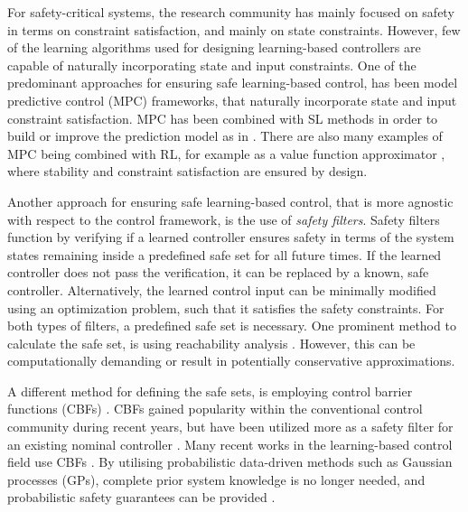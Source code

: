 \documentclass[3p,times,procedia]{elsarticle}
\begin{document}
For safety-critical systems, the research community has mainly focused on safety in terms on constraint satisfaction, and mainly on state constraints. However, few of the learning algorithms used for designing learning-based controllers are capable of naturally incorporating state and input constraints. One of the predominant approaches for ensuring safe learning-based control, has been model predictive control (MPC) frameworks, that naturally incorporate state and input constraint satisfaction. MPC has been combined with SL methods in order to build or improve the prediction model as in \cite{manzano2020robust, Seel2021}. There are also many examples of MPC being combined with RL, for example as a value function approximator \cite{zanon2020safe, gros2019towards}, where stability and constraint satisfaction are ensured by design.


Another approach for ensuring safe learning-based control, that is more agnostic with respect to the control framework, is the use of \textit{safety filters}. Safety filters function by verifying if a learned controller ensures safety in terms of the system states remaining inside a predefined safe set for all future times. If the learned controller does not pass the verification, it can be replaced by a known, safe controller. Alternatively, the learned control input can be minimally modified using an optimization problem, such that it satisfies the safety constraints. For both types of filters, a predefined safe set is necessary. One prominent method to calculate the safe set, is using reachability analysis \cite{Gillula2012}. However, this can be computationally demanding or result in potentially conservative approximations. 



A different method for defining the safe sets, is employing control barrier functions (CBFs) \cite{Wieland2007}. CBFs gained popularity within the conventional control community during recent years, but have been utilized more as a safety filter for an existing nominal controller \cite{ Ames2019}. Many recent works in the learning-based control field use CBFs \cite{Taylor2019a, Marvi2020}. By utilising probabilistic data-driven methods such as Gaussian processes (GPs), complete prior system knowledge is no longer needed, and probabilistic safety guarantees can be provided  \cite{Cheng2019,Khojasteh2019,Wang2017,Dhiman2020}.
\end{document}
